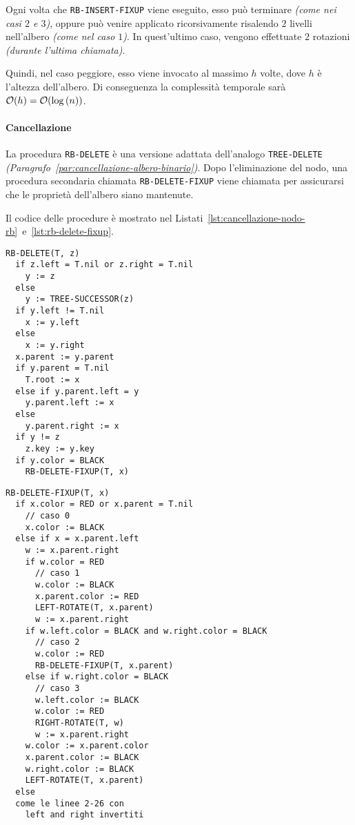 \documentclass[italian, 10pt]{article}
\begin{document}
\bigskip
Ogni volta che \texttt{RB-INSERT-FIXUP} viene eseguito, esso può terminare \textit{(come nei casi \(2\) e \(3\))}, oppure può venire applicato ricorsivamente risalendo \(2\) livelli nell'albero \textit{(come nel caso \(1\))}.
In quest'ultimo caso, vengono effettuate \(2\) rotazioni \textit{(durante l'ultima chiamata)}.

Quindi, nel caso peggiore, esso viene invocato al massimo \(h\) volte, dove \(h\) è l'altezza dell'albero.
Di conseguenza la complessità temporale sarà \(\mathcal{O}(h) = \mathcal{O}(\log{(n)})\).

\paragraph{Cancellazione}
\label{par:cancellazione-rb}

La procedura \texttt{RB-DELETE} è una versione adattata dell'analogo \texttt{TREE-DELETE} \textit{(Paragrafo~\ref{par:cancellazione-albero-binario})}.
Dopo l'eliminazione del nodo, una procedura secondaria chiamata \texttt{RB-DELETE-FIXUP} viene chiamata per assicurarsi che le proprietà dell'albero \RB siano mantenute.

Il codice delle procedure è mostrato nel Listati~\ref{lst:cancellazione-nodo-rb}~e~\ref{lst:rb-delete-fixup}.

\begin{lstlisting}[style=pseudocode, caption={Cancellazione in un RB}, label={lst:cancellazione-nodo-rb}]
RB-DELETE(T, z)
  if z.left = T.nil or z.right = T.nil
    y := z
  else
    y := TREE-SUCCESSOR(z)
  if y.left != T.nil
    x := y.left
  else
    x := y.right
  x.parent := y.parent
  if y.parent = T.nil
    T.root := x
  else if y.parent.left = y
    y.parent.left := x
  else
    y.parent.right := x
  if y != z
    z.key := y.key
  if y.color = BLACK
    RB-DELETE-FIXUP(T, x)
\end{lstlisting}
\begin{lstlisting}[style=pseudocode, caption={Fixup dopo cancellazione}, label={lst:rb-delete-fixup}]
RB-DELETE-FIXUP(T, x)
  if x.color = RED or x.parent = T.nil
    // caso 0
    x.color := BLACK
  else if x = x.parent.left
    w := x.parent.right
    if w.color = RED
      // caso 1
      w.color := BLACK
      x.parent.color := RED
      LEFT-ROTATE(T, x.parent)
      w := x.parent.right
    if w.left.color = BLACK and w.right.color = BLACK
      // caso 2
      w.color := RED
      RB-DELETE-FIXUP(T, x.parent)
    else if w.right.color = BLACK
      // caso 3
      w.left.color := BLACK
      w.color := RED
      RIGHT-ROTATE(T, w)
      w := x.parent.right
    w.color := x.parent.color
    x.parent.color := BLACK
    w.right.color := BLACK
    LEFT-ROTATE(T, x.parent)
  else
  come le linee 2-26 con
    left and right invertiti
  \end{lstlisting}
\end{document}
